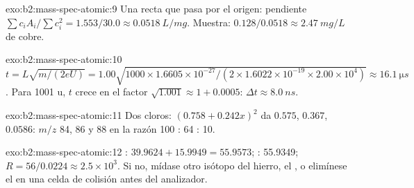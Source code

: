 \begin{solution}{exo:b2:mass-spec-atomic:9}
Una recta que pasa por el origen: pendiente $\sum c_iA_i/\sum c_i^2 = 1.553/30.0 \approx \qty{0.0518}{L/mg}$. Muestra:
$0.128/0.0518 \approx \qty{2.47}{mg/L}$ de cobre.
\end{solution}

\begin{solution}{exo:b2:mass-spec-atomic:10}
$t = L\sqrt{m/(2eU)} = 1.00\sqrt{1000 \times 1.6605 \times 10^{-27}/(2 \times 1.6022 \times 10^{-19}
\times 2.00 \times 10^4)} \approx \qty{16.1}{\micro s}$. Para 1001 u, $t$ crece en el factor
$\sqrt{1.001} \approx 1 + 0.0005$: $\Delta t \approx \qty{8.0}{ns}$.
\end{solution}

\begin{solution}{exo:b2:mass-spec-atomic:11}
Dos cloros: $(0.758 + 0.242x)^2$ da $0.575$, $0.367$, $0.0586$: $m/z$ 84, 86 y 88 en la razón
100 : 64 : 10.
\end{solution}

\begin{solution}{exo:b2:mass-spec-atomic:12}
: $39.9624 + 15.9949 = 55.9573$; : 55.9349; $R = 56/0.0224 \approx 2.5 \times
10^3$. Si no, mídase otro isótopo del hierro, el , o elimínese el  en una celda de colisión
antes del analizador.
\end{solution}

